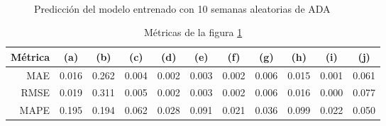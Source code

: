 \documentclass[a4paper,10pt]{article}
\begin{document}
\begin{figure}[H]
    \\
  \caption{Predicción del modelo entrenado con 10 semanas aleatorias de ADA}
  \label{f:ada_wk_arima}
\end{figure}

\begin{table}[H]
 \begin{center}
  \begin{tabular}{|r|c|c|c|c|c|c|c|c|c|c|}
    Métrica & (a) & (b) & (c) & (d) & (e) & (f) & (g) & (h) & (i) & (j) \\ \hline
    MAE & 0.016 & 0.262 & 0.004 & 0.002 & 0.003 & 0.002 & 0.006 & 0.015 & 0.001 & 0.061 \\
    RMSE & 0.019 & 0.311 & 0.005 & 0.002 & 0.003 & 0.002 & 0.006 & 0.016 & 0.000 & 0.077 \\
    MAPE & 0.195 & 0.194 & 0.062 & 0.028 & 0.091 & 0.021 & 0.036 & 0.099 & 0.022 & 0.050 \\ \hline
  \end{tabular}
  \caption{Métricas de la figura \ref{f:ada_wk_arima}}
  \label{tab:ada}
 \end{center}
\end{table}
\end{document}
